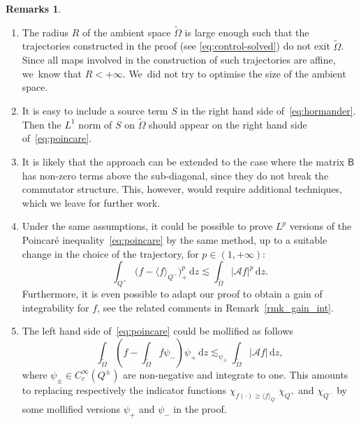 \documentclass[10pt,a4paper]{amsart}
\providecommand{\skpt}{\smallskip}
\theoremstyle{definition}
\newtheorem{remarks}[theorem]{Remarks}
\newcommand{\cA}{{\mathcal A}}
\newcommand{\sB}{{\mathsf B}}
\newcommand{\dd}{{\, \mathrm d}}
\begin{document}
\skpt
\begin{remarks}
\begin{enumerate}
\item The radius $R$ of the ambient space $\tilde \Omega$ is large enough
such that the trajectories constructed in the proof (see
\eqref{eq:control-solved}) do not exit $\tilde \Omega$. Since all maps
involved in the construction of such trajectories are affine, we~know that $R < +\infty$. We~did not try to optimise the size of the ambient space.

\item It is easy to include a source term $S$ in the right hand
side of~\eqref{eq:hormander}. Then the $L^1$ norm of $S$ on
$\tilde \Omega$ should appear on the right hand side
of~\eqref{eq:poincare}.

\item It is likely that the approach can be extended to the
case where the matrix $\sB$ has non-zero terms above the
sub-diagonal, since they do not break the commutator
structure. This, however, would require additional techniques,
which we leave for further work.

\item Under the same assumptions, it could be possible to
prove $L^p$ versions of the Poincaré
inequality~\eqref{eq:poincare} by the same method, up to a suitable change in the choice of the trajectory, for
$p \in (1, + \infty)$:
\begin{equation*}
\int_{Q^+} \big(f - \langle
f\rangle_{Q^-}\big)_+^p \dd z \lesssim
\int_{\tilde \Omega} \big\vert \cA f\big\vert^p \dd z.
\end{equation*}
Furthermore, it is even possible to adapt our proof to
obtain a gain of integrability for $f$, see the
related comments in Remark~\ref{rmk_gain_int}.

\item The left hand side of~\eqref{eq:poincare} could be
mollified as follows\vspace*{-3pt}\enlargethispage{.5\baselineskip}
\begin{equation}
\label{eq:moll-Poincare}
\int_{\tilde \Omega} \left(f - \int_{\tilde \Omega} f \psi_- \right) \psi_+
\dd z \lesssim_{\psi_\pm} \int_{\tilde \Omega} \big\vert \cA
f\big\vert\dd z,
\end{equation}
where $\psi_\pm \in C^\infty_c(Q^\pm)$ are non-negative and
integrate to one. This amounts to replacing respectively the
indicator functions
$\chi_{f(\cdot)\geq \langle f \rangle_{Q^-}} \chi_{Q^+}$ and
$\chi_{Q^-}$ by some mollified versions $\psi_+$ and $\psi_-$
in the proof.


\end{enumerate}
\end{remarks}
\end{document}
